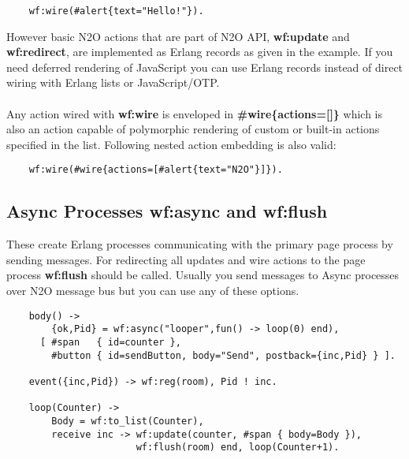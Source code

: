 \vspace{1\baselineskip}
\begin{lstlisting}
    wf:wire(#alert{text="Hello!"}).
\end{lstlisting}
\vspace{1\baselineskip}

However basic N2O actions that are part of N2O API, {\bf wf:update} and {\bf wf:redirect},
are implemented as Erlang records as given in the example. If you need deferred
rendering of JavaScript you can use Erlang records instead of direct wiring with
Erlang lists or JavaScript/OTP.

\paragraph{}
Any action wired with {\bf wf:wire} is enveloped in {\bf \#wire\{actions=[]\}}
which is also an action capable of polymorphic rendering of custom or built-in actions specified in the list.
Following nested action embedding is also valid:

\vspace{1\baselineskip}
\begin{lstlisting}
    wf:wire(#wire{actions=[#alert{text="N2O"}]}).
\end{lstlisting}
\vspace{1\baselineskip}

\subsection{Async Processes {\bf wf:async} and {\bf wf:flush}}
These create Erlang processes communicating with the primary page
process by sending messages. For redirecting all updates and
wire actions to the page process {\bf wf:flush} should be called.
Usually you send messages to Async processes over N2O
message bus but you can use any of these options.

\vspace{1\baselineskip}
\begin{lstlisting}
    body() ->
        {ok,Pid} = wf:async("looper",fun() -> loop(0) end),
      [ #span   { id=counter },
        #button { id=sendButton, body="Send", postback={inc,Pid} } ].

    event({inc,Pid}) -> wf:reg(room), Pid ! inc.

    loop(Counter) ->
        Body = wf:to_list(Counter),
        receive inc -> wf:update(counter, #span { body=Body }),
                       wf:flush(room) end, loop(Counter+1).
\end{lstlisting}

